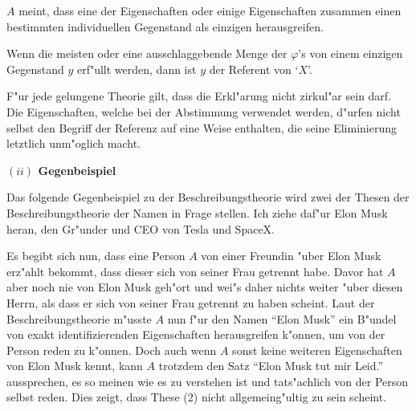 \documentclass[a4paper, emulatestandardclasses, 12pt]{scrartcl}
\begin{document}
\begin{onehalfspace}
\begin{addmargin}[.065\linewidth]{.065\linewidth}%
\footnotesize
\begin{description}[leftmargin=!,labelwidth=\widthof{\bfseries (B)}]
    \item[(2)] $A$ meint, dass eine der Eigenschaften oder einige Eigenschaften zusammen einen bestimmten individuellen Gegenstand als einzigen herausgreifen.
    \item[(3)] Wenn die meisten oder eine ausschlaggebende Menge der $\varphi$'s von einem einzigen Gegenstand $y$ erf"ullt werden, dann ist $y$ der Referent von `$X$'.
    \item[(B)] F"ur jede gelungene Theorie gilt, dass die Erkl"arung nicht zirkul"ar sein darf. Die Eigenschaften, welche bei der Abstimmung verwendet werden, d"urfen nicht selbst den Begriff der Referenz auf eine Weise enthalten, die seine Eliminierung letztlich unm"oglich macht.
\end{description}
\end{addmargin}
\normalsize

\vspace{3mm}
\noindent\textbf{$(ii)$ Gegenbeispiel}	

\noindent Das folgende Gegenbeispiel zu der Beschreibungstheorie wird zwei der Thesen der Beschreibungstheorie der Namen in Frage stellen. Ich ziehe daf"ur Elon Musk heran, den Gr"under und CEO von Tesla und SpaceX. 

Es begibt sich nun, dass eine Person $A$ von einer Freundin "uber Elon Musk erz"ahlt bekommt, dass dieser sich von seiner Frau getrennt habe. Davor hat $A$ aber noch nie von Elon Musk geh"ort und wei"s daher nichts weiter "uber diesen Herrn, als dass er sich von seiner Frau getrennt zu haben scheint. Laut der Beschreibungstheorie m"usste $A$ nun f"ur den Namen "`Elon Musk"' ein B"undel von exakt identifizierenden Eigenschaften herausgreifen k"onnen, um von der Person reden zu k"onnen. Doch auch wenn $A$ sonst keine weiteren Eigenschaften von Elon Musk kennt, kann $A$ trotzdem den Satz "`Elon Musk tut mir Leid."' aussprechen, es so meinen wie es zu verstehen ist und tats"achlich von der Person selbst reden. Dies zeigt, dass These (2) nicht allgemeing"ultig zu sein scheint.
 

\end{onehalfspace}
\end{document}

